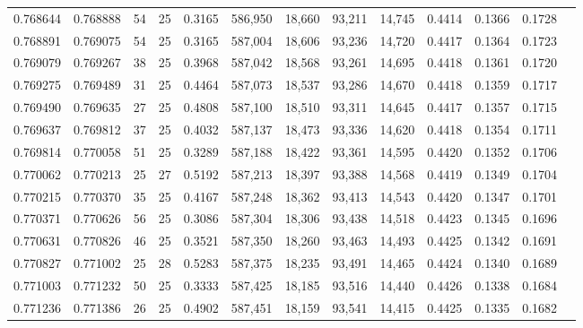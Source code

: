 \begin{tabular}{rrrrrrrrrrrrr}
0.768644 & 0.768888 &    54 &  25 &                                     0.3165 & 586,950 &  18,660 &  93,211 &  14,745 & 0.4414 & 0.1366 & 0.1728 \\
0.768891 & 0.769075 &    54 &  25 &                                     0.3165 & 587,004 &  18,606 &  93,236 &  14,720 & 0.4417 & 0.1364 & 0.1723 \\
0.769079 & 0.769267 &    38 &  25 &                                     0.3968 & 587,042 &  18,568 &  93,261 &  14,695 & 0.4418 & 0.1361 & 0.1720 \\
0.769275 & 0.769489 &    31 &  25 &                                     0.4464 & 587,073 &  18,537 &  93,286 &  14,670 & 0.4418 & 0.1359 & 0.1717 \\
0.769490 & 0.769635 &    27 &  25 &                                     0.4808 & 587,100 &  18,510 &  93,311 &  14,645 & 0.4417 & 0.1357 & 0.1715 \\
0.769637 & 0.769812 &    37 &  25 &                                     0.4032 & 587,137 &  18,473 &  93,336 &  14,620 & 0.4418 & 0.1354 & 0.1711 \\
0.769814 & 0.770058 &    51 &  25 &                                     0.3289 & 587,188 &  18,422 &  93,361 &  14,595 & 0.4420 & 0.1352 & 0.1706 \\
0.770062 & 0.770213 &    25 &  27 &                                     0.5192 & 587,213 &  18,397 &  93,388 &  14,568 & 0.4419 & 0.1349 & 0.1704 \\
0.770215 & 0.770370 &    35 &  25 &                                     0.4167 & 587,248 &  18,362 &  93,413 &  14,543 & 0.4420 & 0.1347 & 0.1701 \\
0.770371 & 0.770626 &    56 &  25 &                                     0.3086 & 587,304 &  18,306 &  93,438 &  14,518 & 0.4423 & 0.1345 & 0.1696 \\
0.770631 & 0.770826 &    46 &  25 &                                     0.3521 & 587,350 &  18,260 &  93,463 &  14,493 & 0.4425 & 0.1342 & 0.1691 \\
0.770827 & 0.771002 &    25 &  28 &                                     0.5283 & 587,375 &  18,235 &  93,491 &  14,465 & 0.4424 & 0.1340 & 0.1689 \\
0.771003 & 0.771232 &    50 &  25 &                                     0.3333 & 587,425 &  18,185 &  93,516 &  14,440 & 0.4426 & 0.1338 & 0.1684 \\
0.771236 & 0.771386 &    26 &  25 &                                     0.4902 & 587,451 &  18,159 &  93,541 &  14,415 & 0.4425 & 0.1335 & 0.1682 \\

\end{tabular}
